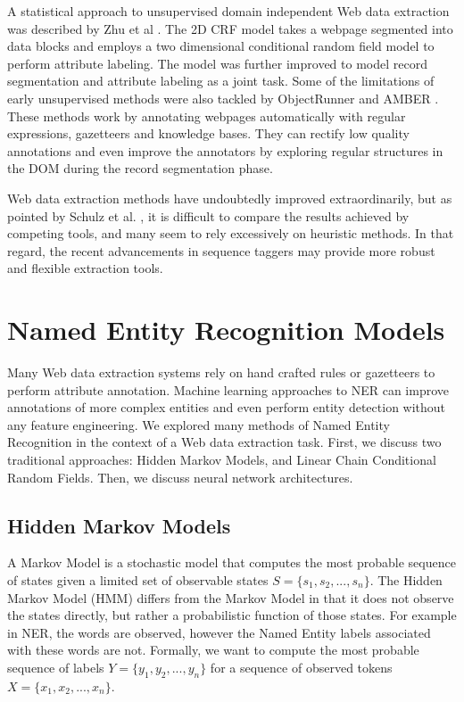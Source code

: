 \documentclass{nle}
\begin{document}
A statistical approach to unsupervised domain 
independent Web data extraction was described by Zhu et al . The 2D CRF 
model takes a webpage segmented into data blocks and employs a two dimensional conditional 
random field model to perform attribute labeling. The model was further improved
\cite{Zhu2006} to model record segmentation and attribute labeling as a joint task.
Some of the limitations of early unsupervised methods 
were also tackled by ObjectRunner \cite{Abdessalem2010} and AMBER \cite{Furche2012}. 
These methods work by annotating webpages automatically with regular expressions, gazetteers and 
knowledge bases. They can rectify low quality annotations and even improve the annotators
by exploring regular structures in the DOM during the record segmentation phase.

Web data extraction methods have undoubtedly improved extraordinarily, but
as pointed by Schulz et al. , it is difficult to compare the results 
achieved by competing tools, and many seem to rely excessively on heuristic methods.
In that regard, the recent advancements in sequence taggers may provide more robust and
flexible extraction tools.

\section{Named Entity Recognition Models}

Many Web data extraction systems rely on hand crafted rules or gazetteers to perform
attribute annotation. Machine learning approaches to NER can improve annotations of 
more complex entities and even perform entity detection without any feature
engineering. We explored many methods of Named Entity Recognition
in the context of a Web data extraction task. First, we discuss two traditional 
approaches: Hidden Markov Models, and Linear Chain Conditional Random Fields. Then,
we discuss neural network architectures.

\subsection{Hidden Markov Models}

A Markov Model is a stochastic model that computes the most probable sequence of states 
given a limited set of observable states $ S = \{s_1, s_2, ..., s_n \} $.
The Hidden Markov Model (HMM) differs from the Markov Model in that it
does not observe the states directly, but rather a probabilistic function of those 
states. For example in NER, the words are observed, however the Named Entity labels
associated with these words are not. Formally, we want to compute the most probable
sequence of labels $ Y = \{y_1, y_2, ..., y_n\} $ for a sequence of observed tokens
$ X = \{x_1, x_2, ..., x_n\} $.
\end{document}
